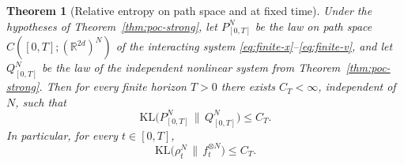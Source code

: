 \documentclass[11pt]{article}
\newtheorem{theorem}{Theorem}[section]
\theoremstyle{definition}
\theoremstyle{remark}
\newcommand{\R}{\mathbb{R}}
\newcommand{\KL}{\mathrm{KL}}
\begin{document}
\begin{theorem}[Relative entropy on path space and at fixed time]\label{thm:poc}
Under the hypotheses of Theorem~\ref{thm:poc-strong},
let $P_{[0,T]}^N$ be the law on path space
$C([0,T];(\R^{2d})^N)$ of the interacting system
\eqref{eq:finite-x}--\eqref{eq:finite-v}, and let $Q_{[0,T]}^N$ be the law of
the independent nonlinear system from Theorem~\ref{thm:poc-strong}. Then for
every finite horizon $T>0$ there exists $C_T<\infty$, independent of $N$, such
that
\begin{equation}\label{eq:path-kl}
\KL\bigl(P_{[0,T]}^N\,\|\,Q_{[0,T]}^N\bigr)\leq C_T.
\end{equation}
In particular, for every $t\in[0,T]$,
\begin{equation}\label{eq:hn}
\KL\bigl(\rho_t^N\,\|\,f_t^{\otimes N}\bigr)\leq C_T.
\end{equation}
\end{theorem}
\end{document}
